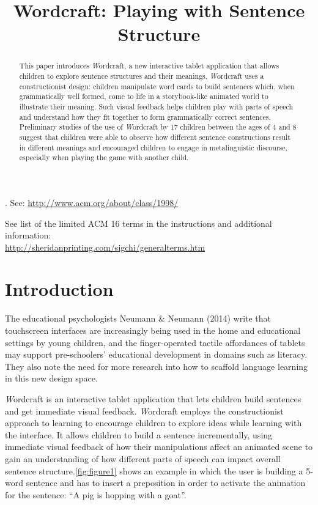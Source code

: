 \documentclass{sigchi-ext}
\title{Wordcraft: Playing with Sentence Structure}
\author{
  \vspace{4em} %
  \alignauthor{
  	\textbf{First Author}\\
  	\affaddr{AuthorCo, Inc.}\\
  	\affaddr{Authortown, PA 54321 USA}\\
  	\email{author1@anotherco.com}
  }\alignauthor{
  	\textbf{Fourth Author}\\
  	\affaddr{AuthorCo, Inc.}\\
  	\affaddr{Authortown, PA 54321 USA}\\
  	\email{author4@anotherco.com}
  }\vfil
  \alignauthor{
  	\textbf{Second Author}\\
  	\affaddr{AuthorCo, Inc.}\\
  	\affaddr{Authortown, PA 54321 USA}\\
  	\email{author2@anotherco.com}
  }\alignauthor{
  	\textbf{Fifth Author}\\
  	\affaddr{AuthorCo, Inc.}\\
  	\affaddr{Authortown, PA 54321 USA}\\
  	\email{author5@anotherco.com}
  }\vfil
  \alignauthor{
  	\textbf{Third Author}\\
  	\affaddr{AuthorCo, Inc.}\\
  	\affaddr{Authortown, PA 54321 USA}\\
  	\email{author3@anotherco.com}
  }\alignauthor{
  	\textbf{Sixth Author}\\
  	\affaddr{AuthorCo, Inc.}\\
  	\affaddr{Authortown, PA 54321 USA}\\
  	\email{author6@anotherco.com}
  }\vfil
  \alignauthor{
  	\textbf{Seventh Author}\\
  	\affaddr{AuthorCo, Inc.}\\
  	\affaddr{Authortown, PA 54321 USA}\\
  	\email{author3@anotherco.com}
  }
}
\begin{document}
\maketitle

\begin{abstract}
This paper introduces \emph Wordcraft, a new interactive tablet application that allows children to explore sentence structures and their meanings. \emph Wordcraft uses a constructionist design: children manipulate word cards to build sentences which, when grammatically well formed, come to life in a storybook-like animated world to illustrate their meaning. Such visual feedback helps children play with parts of speech and understand how they fit together to form grammatically correct sentences.  Preliminary studies of the use of \emph Wordcraft by 17 children between the ages of 4 and 8 suggest that children were able to observe how different sentence constructions result in different meanings and encouraged children to engage in metalinguistic discourse, especially when playing the game with another child.
\end{abstract}


. 
See: \url{http://www.acm.org/about/class/1998/} 

\terms{}
See list of the limited ACM 16 terms in the instructions and additional information:\\
\url{http://sheridanprinting.com/sigchi/generalterms.htm}\\


\section{Introduction}
The educational psychologists Neumann & Neumann (2014) write that touchscreen interfaces are increasingly being used in the home and educational settings by young children, and the finger-operated tactile affordances of tablets may support pre-schoolers’ educational development in domains such as literacy.  They also note the need for more research into how to scaffold language learning in this new design space.

\emph Wordcraft is an interactive tablet application that lets children build sentences and get immediate visual feedback. \emph Wordcraft employs the constructionist approach to learning to encourage children to explore ideas while learning with the interface. It allows children to build a sentence incrementally, using immediate visual feedback of how their manipulations affect an animated scene to gain an understanding of how different parts of speech can impact overall sentence structure.\autoref {fig:figure1} shows an example in which the user is building a 5-word sentence and has to insert a preposition in order to activate the animation for the sentence: ``A pig is hopping with a goat''.
\end{document}
